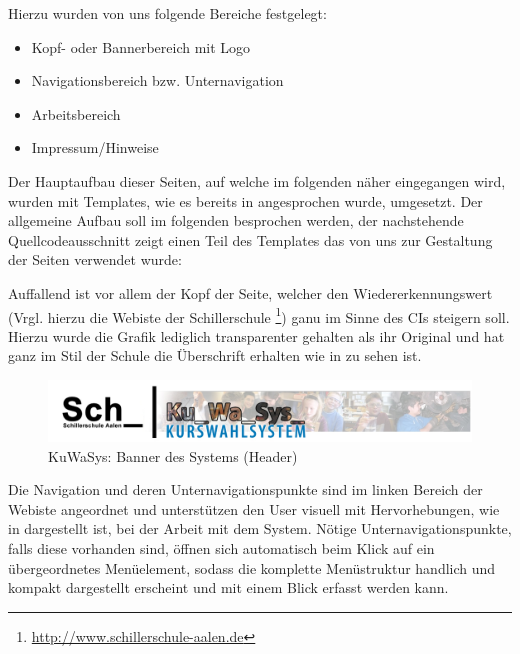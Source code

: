 \documentclass[12pt, twoside, a4paper, ngerman]{article}
\newcommand{\iz}[2]{#1 {\renewcommand{\baselinestretch}{1}\footnote{#2}}} %
\renewcommand{\baselinestretch}{1.5}
\begin{document}
Hierzu wurden von uns folgende Bereiche festgelegt:
\begin{itemize}
  \item Kopf- oder Bannerbereich mit Logo
  \item Navigationsbereich bzw. Unternavigation
  \item Arbeitsbereich
  \item Impressum/Hinweise
\end{itemize}

Der Hauptaufbau dieser Seiten, auf welche im folgenden näher eingegangen wird, wurden mit Templates, wie es bereits in  angesprochen wurde, umgesetzt.
Der allgemeine Aufbau soll im folgenden besprochen werden, der nachstehende Quellcodeausschnitt zeigt einen Teil des Templates das von uns zur Gestaltung der Seiten verwendet wurde:

Auffallend ist vor allem der Kopf der Seite, welcher den Wiedererkennungswert (Vrgl. hierzu die \iz{Webiste der Schillerschule}{\url{http://www.schillerschule-aalen.de}}) ganu im Sinne des \ac{CI}s steigern soll.
Hierzu wurde die Grafik lediglich transparenter gehalten als ihr Original und hat ganz im Stil der Schule die Überschrift erhalten wie in  zu sehen ist.

\begin{figure}[H]
 \begin{center}
   \includegraphics[scale=0.4]{img/header_KuWaSys.png}
 \end{center}
 \caption[\textbf{KuWaSys: Banner des Systems (Header)}]{KuWaSys: Banner des Systems (Header)}
 \label{fig:header_KuWaSys}
\end{figure}

Die Navigation und deren Unternavigationspunkte sind im linken Bereich der Webiste angeordnet und unterstützen den User visuell mit Hervorhebungen, wie in  dargestellt ist, bei der Arbeit mit dem System.
Nötige Unternavigationspunkte, falls diese vorhanden sind, öffnen sich automatisch beim Klick auf ein übergeordnetes Menüelement, sodass die komplette Menüstruktur handlich und kompakt dargestellt erscheint und mit einem Blick erfasst werden kann.
\end{document}
